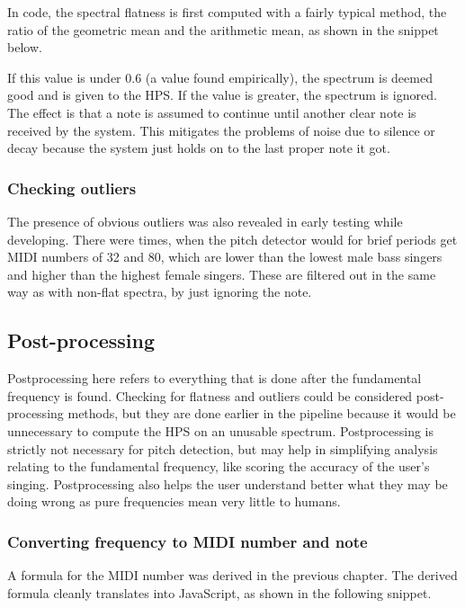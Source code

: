 In code, the spectral flatness is first computed with a fairly typical method, the ratio of the geometric mean and the arithmetic mean, as shown in the snippet below.



If this value is under $0.6$ (a value found empirically), the spectrum is deemed good and is given to the HPS. If the value is greater, the spectrum is ignored. The effect is that a note is assumed to continue until another clear note is received by the system. This mitigates the problems of noise due to silence or decay because the system just holds on to the last proper note it got. 

\subsubsection{Checking outliers}
The presence of obvious outliers was also revealed in early testing while developing. There were times, when the pitch detector would for brief periods get MIDI numbers of 32 and 80, which are lower than the lowest male bass singers and higher than the highest female singers. These are filtered out in the same way as with non-flat spectra, by just ignoring the note. 

\subsection{Post-processing}
Postprocessing here refers to everything that is done after the fundamental frequency is found. Checking for flatness and outliers could be considered post-processing methods, but they are done earlier in the pipeline because it would be unnecessary to compute the HPS on an unusable spectrum. Postprocessing is strictly not necessary for pitch detection, but may help in simplifying analysis relating to the fundamental frequency, like scoring the accuracy of the user's singing. Postprocessing also helps the user understand better what they may be doing wrong as pure frequencies mean very little to humans. 

\subsubsection{Converting frequency to MIDI number and note}
A formula for the MIDI number was derived in the previous chapter. The derived formula cleanly translates into JavaScript, as shown in the following snippet.

